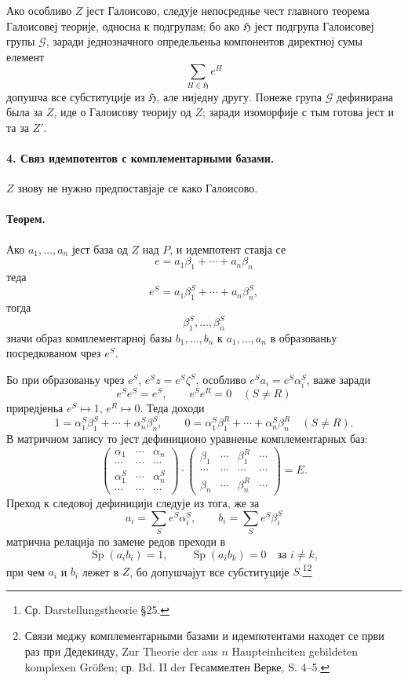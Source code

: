 ﻿\documentclass[11pt]{article}
\newcommand{\foreign}[1]{#1}
\providecommand{\Gcal}{\mathcal G}
\providecommand{\Sp}{\operatorname{Sp}}
\begin{document}
Ако особливо \(Z\) јест Галоисово, следује непосреднье чест главного теорема Галоисовеј теорије, односна к подгрупам; бо ако \(\mathfrak H\) јест подгрупа Галоисовеј групы \(\Gcal\), заради једнозначного определьеньа компонентов директној сумы елемент
\[
        \sum_{H\in\mathfrak H} e^H
\]
допушча все субституције из \(\mathfrak H\), але ниједну другу. Понеже група \(\Gcal\) дефинирана была за \(Z\), иде о Галоисову теорију од \(Z\); заради изоморфије с тым готова јест и та за \(Z'\).

\paragraph{4. Связ идемпотентов с комплементарными базами.}
\(Z\) знову не нужно предпоставјаје се како Галоисово.

\paragraph{Теорем.}
Ако \(a_1,\ldots,a_n\) јест база од \(Z\) над \(P\), и идемпотент ставја се
\[
        e=a_1\beta_1+\cdots+a_n\beta_n
\]
теда
\[
        e^S=a_1\beta_1^S+\cdots+a_n\beta_n^S,
\]
тогда
\[
        \beta_1^S,\ldots,\beta_n^S
\]
значи образ комплементарној базы \(b_1,\ldots,b_n\) к \(a_1,\ldots,a_n\) в образованьу посредкованом чрез \(e^S\).

Бо при образованьу чрез \(e^S\), \(e^Sz=e^S\zeta^S\), особливо \(e^Sa_i=e^S\alpha_i^S\), важе заради
\[
        e^Se^S=e^S,\qquad e^Se^R=0\quad(S\ne R)
\]
приредјеньа \(e^S\mapsto1\), \(e^R\mapsto0\). Теда доходи
\[
        1=\alpha_1^S\beta_1^S+\cdots+\alpha_n^S\beta_n^S,\qquad
        0=\alpha_1^S\beta_1^R+\cdots+\alpha_n^S\beta_n^R\quad(S\ne R).
\]
В матричном запису то јест дефиниционо уравненье комплементарных баз:
\[
\begin{pmatrix}
\alpha_1 & \cdots & \alpha_n\\
\cdots & \cdots & \cdots\\
\alpha_1^S & \cdots & \alpha_n^S\\
\cdots & \cdots & \cdots
\end{pmatrix}
\cdot
\begin{pmatrix}
\beta_1 & \cdots & \beta_1^R & \cdots\\
\cdots & \cdots & \cdots & \cdots\\
\beta_n & \cdots & \beta_n^R & \cdots
\end{pmatrix}
=
E.
\]
Преход к следовој дефиницији следује из тога, же за
\[
        a_i=\sum_S e^S\alpha_i^S,\qquad b_i=\sum_S e^S\beta_i^S
\]
матрична релација по замене редов преходи в
\[
        \Sp(a_i b_i)=1,\qquad \Sp(a_i b_k)=0\quad\text{за }i\ne k,
\]
при чем \(a_i\) и \(b_i\) лежет в \(Z\), бо допушчајут все субституције \(S\).\footnote{Ср. \foreign{Darstellungstheorie} §25.}\footnote{Связи меджу комплементарными базами и идемпотентами находет се први раз при Дедекинду, \foreign{Zur Theorie der aus \(n\) Haupteinheiten gebildeten komplexen Größen}; ср. Bd. II der Гесаммелтен Верке, S. 4--5.}
\end{document}
